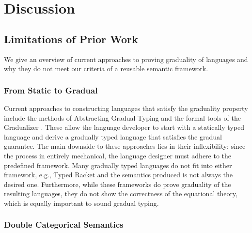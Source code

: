 \section{Discussion}\label{sec:discussion}


\subsection{Limitations of Prior Work}

We give an overview of current approaches to proving graduality of
languages and why they do not meet our criteria of a reusable semantic
framework.

\subsubsection{From Static to Gradual}

Current approaches to constructing languages that satisfy the
graduality property include the methods of Abstracting Gradual Typing
\cite{garcia-clark-tanter2016} and the formal tools of the Gradualizer
\cite{cimini-siek2016}.  These allow the language developer to start
with a statically typed language and derive a gradually typed language
that satisfies the gradual guarantee. The main downside to these
approaches lies in their inflexibility: since the process in entirely
mechanical, the language designer must adhere to the predefined
framework.  Many gradually typed languages do not fit into either
framework, e.g., Typed Racket \cite{tobin-hochstadt06,
  tobin-hochstadt08} and the semantics produced is not always the
desired one.
%
Furthermore, while these frameworks do prove graduality of the
resulting languages, they do not show the correctness of the
equational theory, which is equally important to sound gradual typing.

\subsubsection{Double Categorical Semantics}

